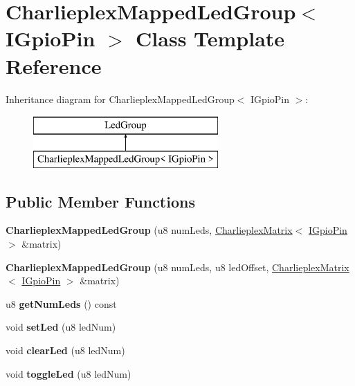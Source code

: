 \hypertarget{class_charlieplex_mapped_led_group}{}\section{Charlieplex\+Mapped\+Led\+Group$<$ I\+Gpio\+Pin $>$ Class Template Reference}
\label{class_charlieplex_mapped_led_group}
Inheritance diagram for Charlieplex\+Mapped\+Led\+Group$<$ I\+Gpio\+Pin $>$\+:\begin{figure}[H]
\begin{center}
\leavevmode
\includegraphics[height=2.000000cm]{class_charlieplex_mapped_led_group}
\end{center}
\end{figure}
\subsection*{Public Member Functions}
\begin{DoxyCompactItemize}
\item 
\mbox{\label{class_charlieplex_mapped_led_group_a0b34aad43db4bb8bae5f4e3cc866e86f}} 
{\bfseries Charlieplex\+Mapped\+Led\+Group} (u8 num\+Leds, \mbox{\hyperlink{class_charlieplex_matrix}{Charlieplex\+Matrix}}$<$ \mbox{\hyperlink{class_i_gpio_pin}{I\+Gpio\+Pin}} $>$ \&matrix)
\item 
\mbox{\label{class_charlieplex_mapped_led_group_af25bc2d2fb32e3a255fb6252a61cbc4d}} 
{\bfseries Charlieplex\+Mapped\+Led\+Group} (u8 num\+Leds, u8 led\+Offset, \mbox{\hyperlink{class_charlieplex_matrix}{Charlieplex\+Matrix}}$<$ \mbox{\hyperlink{class_i_gpio_pin}{I\+Gpio\+Pin}} $>$ \&matrix)
\item 
\mbox{\label{class_charlieplex_mapped_led_group_af314cfb407b449b336ea57df558bad44}} 
u8 {\bfseries get\+Num\+Leds} () const
\item 
\mbox{\label{class_charlieplex_mapped_led_group_a2739fd88dcff3eec40f860e0c06ab253}} 
void {\bfseries set\+Led} (u8 led\+Num)
\item 
\mbox{\label{class_charlieplex_mapped_led_group_a50cf0b05d56b8033d6fda4f02ec51077}} 
void {\bfseries clear\+Led} (u8 led\+Num)
\item 
\mbox{\label{class_charlieplex_mapped_led_group_a61ec4c128a5c799d76def9f05124bc6f}} 
void {\bfseries toggle\+Led} (u8 led\+Num)
\end{DoxyCompactItemize}


